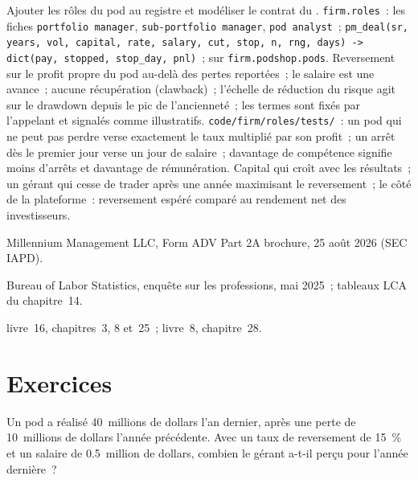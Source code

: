 \begin{build}
 Ajouter les rôles du pod au registre et modéliser le contrat du .
 \texttt{firm.roles}~: les fiches \texttt{portfolio manager}, \texttt{sub-portfolio manager},
\texttt{pod analyst}~;
\texttt{pm\_deal(sr, years, vol, capital, rate, salary, cut, stop, n, rng, days) -> dict(pay, stopped, stop\_day, pnl)}~; sur \texttt{firm.podshop.pods}.
 Reversement sur le profit propre du pod au-delà des pertes reportées~; le salaire est une avance~; aucune récupération (clawback)~; l'échelle de
réduction du risque agit sur le drawdown depuis le pic de l'ancienneté~; les termes sont fixés par l'appelant et signalés comme illustratifs.
 \texttt{code/firm/roles/tests/}~: un pod qui ne peut pas perdre verse exactement le taux multiplié par son profit~;
un arrêt dès le premier jour verse un jour de salaire~; davantage de compétence signifie moins d'arrêts et davantage de rémunération.
 Capital qui croît avec les résultats~; un gérant qui cesse de trader après une année maximisant le reversement~; le
côté de la plateforme~: reversement espéré comparé au rendement net des investisseurs.
\end{build}

\begin{omsources}
\item Millennium Management LLC, Form ADV Part 2A brochure, 25 août 2026 (SEC IAPD).
\item Bureau of Labor Statistics, enquête sur les professions, mai 2025~; tableaux LCA du chapitre~14.
\item livre~16, chapitres~3, 8 et~25~; livre~8, chapitre~28.
\end{omsources}

\section{Exercices}

\begin{exercise}[$\star$]\label{exo:in:portfolio-manager-and-pod-analyst:1}
Un pod a réalisé 40~millions de dollars l'an dernier, après une perte de 10~millions de dollars l'année précédente. Avec un taux de reversement de 15~\% et un salaire de 0.5~million
de dollars, combien le gérant a-t-il perçu pour l'année dernière~?
\end{exercise}

